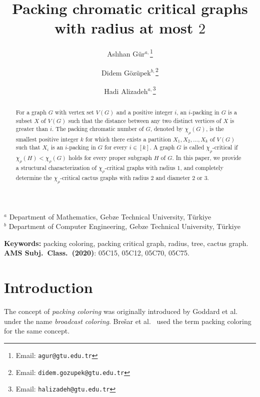 \documentclass[12pt]{article}
\begin{document}
\title{Packing chromatic critical graphs with radius at most $2$}

\author{
Asl{\i}han G\"{u}r$^{a,}$\thanks{Email: \texttt{agur@gtu.edu.tr}}
\and 
 Didem G\"{o}z\"{u}pek$^{b,}$\thanks{Email: \texttt{didem.gozupek@gtu.edu.tr}}
\and 
Hadi Alizadeh$^{a,}$\thanks{Email: \texttt{halizadeh@gtu.edu.tr}}
}
\maketitle

\begin{center}
$^a$ Department of Mathematics, Gebze Technical University, T\"urkiye\\
	\medskip
	$^b$ Department of Computer Engineering, Gebze Technical University, T\"urkiye
\end{center}

\begin{abstract}
For a graph $G$ with vertex set $V(G)$ and a positive integer $i$, an $i$-packing in $G$ is a subset $X$ of $V(G)$ such that the distance between any two distinct vertices of $X$ is greater than $i$. 
The packing chromatic number of $G$, denoted by $\chi_{\rho}(G)$, is the smallest positive integer $k$ for which there exists a partition $X_1, X_2, \ldots, X_k$ of $V(G)$ such that $X_i$ is an $i$-packing in $G$ for every $i \in [k]$. A graph $G$ is called  $\chi_\rho$-critical if $\chi_\rho(H) < \chi_\rho(G)$ holds for every proper subgraph $H$ of $G$. In this paper, we provide a structural characterization of $\chi_{\rho}$-critical graphs with radius $1$, and completely determine the $\chi_{\rho}$-critical cactus graphs with radius $2$ and diameter $2$ or $3$.
\end{abstract}

\noindent
{\bf Keywords:} packing coloring, packing critical graph, radius, tree, cactus graph. \\

\noindent
{\bf AMS Subj.\ Class.\ (2020)}: 05C15, 05C12, 05C70, 05C75.

\section{Introduction} \label{sec:intro}
The concept of \textit{packing coloring} was originally introduced by Goddard et al.~\cite{goddard-2008} under the name \textit{broadcast coloring}. Bre\v{s}ar et al.~\cite{bresar-2007} used the term packing coloring for the same concept.
\end{document}
